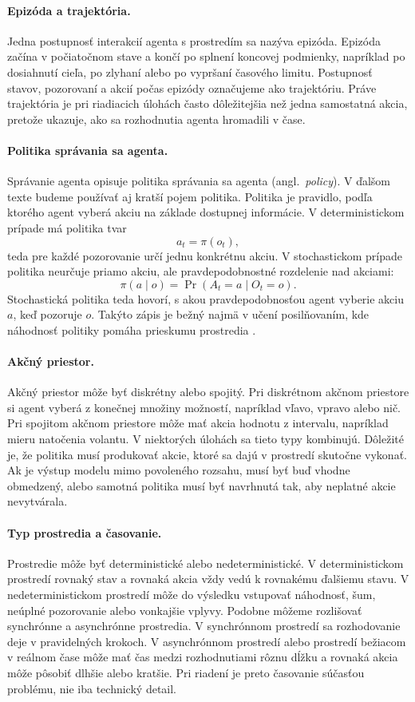 \paragraph{Epizóda a trajektória.}
Jedna postupnosť interakcií agenta s prostredím sa nazýva epizóda. Epizóda začína v počiatočnom stave a končí po splnení koncovej podmienky, napríklad po dosiahnutí cieľa, po zlyhaní alebo po vypršaní časového limitu. Postupnosť stavov, pozorovaní a akcií počas epizódy označujeme ako trajektóriu. Práve trajektória je pri riadiacich úlohách často dôležitejšia než jedna samostatná akcia, pretože ukazuje, ako sa rozhodnutia agenta hromadili v čase.

\paragraph{Politika správania sa agenta.}
Správanie agenta opisuje politika správania sa agenta (angl.~\emph{policy}). V ďalšom texte budeme používať aj kratší pojem politika. Politika je pravidlo, podľa ktorého agent vyberá akciu na základe dostupnej informácie. V deterministickom prípade má politika tvar
\[
    a_t = \pi(o_t),
\]
teda pre každé pozorovanie určí jednu konkrétnu akciu. V stochastickom prípade politika neurčuje priamo akciu, ale pravdepodobnostné rozdelenie nad akciami:
\[
    \pi(a \mid o) = \Pr(A_t = a \mid O_t = o).
\]
Stochastická politika teda hovorí, s akou pravdepodobnosťou agent vyberie akciu $a$, keď pozoruje $o$. Takýto zápis je bežný najmä v učení posilňovaním, kde náhodnosť politiky pomáha prieskumu prostredia \cite{sutton_barto2018rl}.

\paragraph{Akčný priestor.}
Akčný priestor môže byť diskrétny alebo spojitý. Pri diskrétnom akčnom priestore si agent vyberá z konečnej množiny možností, napríklad vľavo, vpravo alebo nič. Pri spojitom akčnom priestore môže mať akcia hodnotu z intervalu, napríklad mieru natočenia volantu. V niektorých úlohách sa tieto typy kombinujú. Dôležité je, že politika musí produkovať akcie, ktoré sa dajú v prostredí skutočne vykonať. Ak je výstup modelu mimo povoleného rozsahu, musí byť buď vhodne obmedzený, alebo samotná politika musí byť navrhnutá tak, aby neplatné akcie nevytvárala.

\paragraph{Typ prostredia a časovanie.}
Prostredie môže byť deterministické alebo nedeterministické. V deterministickom prostredí rovnaký stav a rovnaká akcia vždy vedú k rovnakému ďalšiemu stavu. V nedeterministickom prostredí môže do výsledku vstupovať náhodnosť, šum, neúplné pozorovanie alebo vonkajšie vplyvy. Podobne môžeme rozlišovať synchrónne a asynchrónne prostredia. V synchrónnom prostredí sa rozhodovanie deje v pravidelných krokoch. V asynchrónnom prostredí alebo prostredí bežiacom v reálnom čase môže mať čas medzi rozhodnutiami rôznu dĺžku a rovnaká akcia môže pôsobiť dlhšie alebo kratšie. Pri riadení je preto časovanie súčasťou problému, nie iba technický detail.

